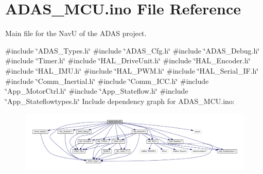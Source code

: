 \hypertarget{_a_d_a_s___m_c_u_8ino}{}\section{A\+D\+A\+S\+\_\+\+M\+C\+U.\+ino File Reference}
\label{_a_d_a_s___m_c_u_8ino}


Main file for the NavU of the A\+D\+AS project.  


{\ttfamily \#include \char`\"{}A\+D\+A\+S\+\_\+\+Types.\+h\char`\"{}}\newline
{\ttfamily \#include \char`\"{}A\+D\+A\+S\+\_\+\+Cfg.\+h\char`\"{}}\newline
{\ttfamily \#include \char`\"{}A\+D\+A\+S\+\_\+\+Debug.\+h\char`\"{}}\newline
{\ttfamily \#include \char`\"{}Timer.\+h\char`\"{}}\newline
{\ttfamily \#include \char`\"{}H\+A\+L\+\_\+\+Drive\+Unit.\+h\char`\"{}}\newline
{\ttfamily \#include \char`\"{}H\+A\+L\+\_\+\+Encoder.\+h\char`\"{}}\newline
{\ttfamily \#include \char`\"{}H\+A\+L\+\_\+\+I\+M\+U.\+h\char`\"{}}\newline
{\ttfamily \#include \char`\"{}H\+A\+L\+\_\+\+P\+W\+M.\+h\char`\"{}}\newline
{\ttfamily \#include \char`\"{}H\+A\+L\+\_\+\+Serial\+\_\+\+I\+F.\+h\char`\"{}}\newline
{\ttfamily \#include \char`\"{}Comm\+\_\+\+Inertial.\+h\char`\"{}}\newline
{\ttfamily \#include \char`\"{}Comm\+\_\+\+I\+C\+C.\+h\char`\"{}}\newline
{\ttfamily \#include \char`\"{}App\+\_\+\+Motor\+Ctrl.\+h\char`\"{}}\newline
{\ttfamily \#include \char`\"{}App\+\_\+\+Stateflow.\+h\char`\"{}}\newline
{\ttfamily \#include \char`\"{}App\+\_\+\+Stateflowtypes.\+h\char`\"{}}\newline
Include dependency graph for A\+D\+A\+S\+\_\+\+M\+C\+U.\+ino\+:
\nopagebreak
\begin{figure}[H]
\begin{center}
\leavevmode
\includegraphics[width=350pt]{_a_d_a_s___m_c_u_8ino__incl}
\end{center}
\end{figure}

